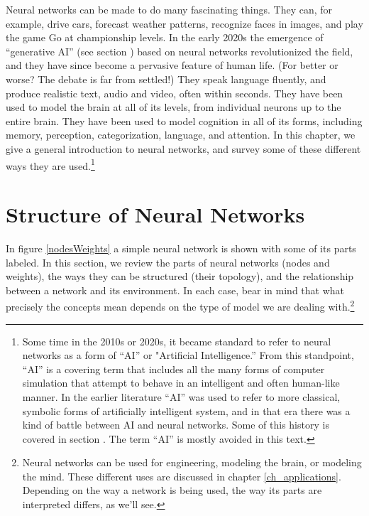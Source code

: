 Neural networks can be made to do many fascinating things. They can, for example, drive cars, forecast weather patterns, recognize faces in images, and play the game Go at championship levels. In the early 2020s the emergence of ``generative AI'' (see section ) based on neural networks revolutionized the field, and they have since become a pervasive feature of human life. (For better or worse? The debate is far from settled!) They speak language fluently, and produce realistic text, audio and video, often within seconds. They have been used to model the brain at all of its levels, from individual neurons up to the entire brain. They have been used to model cognition in all of its forms, including memory, perception, categorization, language, and attention. In this chapter, we give a general introduction to neural networks, and survey some of these different ways they are used.\footnote{Some time in the 2010s or 2020s, it became standard to refer to neural networks as a form of ``AI'' or "Artificial Intelligence.''  From this standpoint, ``AI'' is a covering term that includes all the many forms of computer simulation that attempt to behave in an intelligent and often human-like manner.  In the earlier literature ``AI'' was used to refer to more classical, symbolic forms of artificially intelligent system, and in that era there was a kind of battle between AI and neural networks. Some of this history is covered in section .  The term ``AI'' is mostly avoided in this text.}

\section{Structure of Neural Networks}\label{structureNets}

In figure \ref{nodesWeights} a simple neural network is shown with some of its parts labeled. In this section, we review the parts of neural networks (nodes and weights), the ways they can be structured (their topology), and the relationship between a network and its environment. In each case, bear in mind that what precisely the concepts mean depends on the type of model we are dealing with.\footnote{Neural networks can be used for engineering, modeling the brain, or modeling the mind. These different uses are discussed in chapter \ref{ch_applications}. Depending on the way a network is being used, the way its parts are interpreted differs, as we'll see.} 

